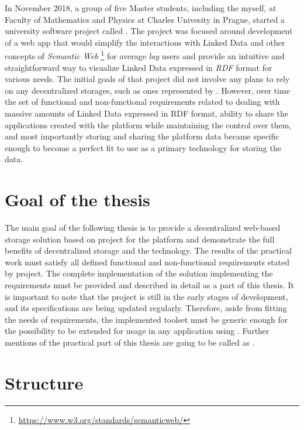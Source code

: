 In November 2018, a group of five Master students, including the myself, at Faculty of Mathematics and Physics at Charles Univesity in Prague, started a university software project called \lpa{}. The project was focused around development of a web app that would simplify the interactions with Linked Data and other concepts of \textit{Semantic Web} \footnote{\url{https://www.w3.org/standards/semanticweb/}} for average \textit{lay} users and provide an intuitive and straightforward way to visualize Linked Data expressed in \textit{RDF} format for various needs. The initial goals of that project did not involve any plans to rely on any decentralized storages, such as ones represented by \solid{}. However, over time the set of functional and non-functional requirements related to dealing with massive amounts of Linked Data expressed in RDF format, ability to share the applications created with the platform while maintaining the control over them, and most importantly storing and sharing the \lpa{} platform data became specific enough to become a perfect fit to use \solid{} as a primary technology for storing the data. 
 
\section*{Goal of the thesis}
The main goal of the following thesis is to provide a decentralized web-based storage solution based on \solid{} project for the \lpa{} platform and demonstrate the full benefits of decentralized storage and the \solid{} technology. The results of the practical work must satisfy all defined functional and non-functional requirements stated by \lpa{} project. The complete implementation of the solution implementing the requirements must be provided and described in detail as a part of this thesis. It is important to note that the \solid{} project is still in the early stages of development, and its specifications are being updated regularly. Therefore, aside from fitting the needs of \lpa{} requirements, the implemented toolset must be generic enough for the possibility to be extended for usage in any application using \solid{}. Further mentions of the practical part of this thesis are going to be called as \lpas{}.

\section*{Structure}

